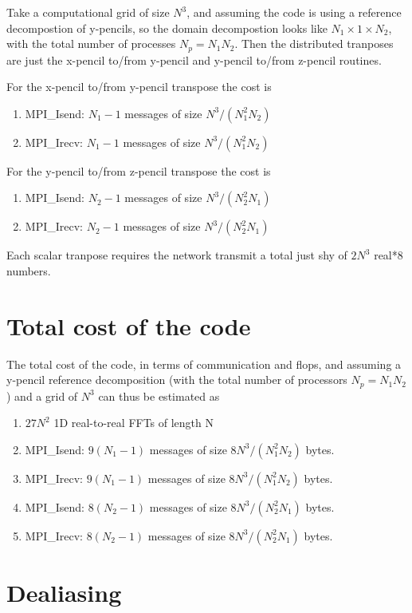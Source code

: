 \documentclass[12pt]{article}
\begin{document}
Take a computational grid of size $N^3$, and assuming the code is
using a reference decompostion of y-pencils, so the domain
decompostion looks like $N_1 \times 1 \times N_2$, with the total
number of processes $N_p = N_1 N_2 $.   Then the distributed
tranposes are just the x-pencil to/from y-pencil and y-pencil to/from
z-pencil routines.  

For the x-pencil to/from y-pencil transpose the cost is
\begin{enumerate}
\item MPI\_Isend:  $N_1 -1$ messages of size $N^3/(N_1^2 N_2)$
\item MPI\_Irecv:  $N_1 -1$ messages of size $N^3/(N_1^2 N_2)$
\end{enumerate}

For the y-pencil to/from z-pencil transpose the cost is
\begin{enumerate}
\item MPI\_Isend:  $N_2 -1$ messages of size $N^3/(N_2^2 N_1)$
\item MPI\_Irecv:  $N_2 -1$ messages of size $N^3/(N_2^2 N_1)$
\end{enumerate}


Each scalar tranpose requires the network transmit a total just
shy of $2N^3$ real*8 numbers.  


\section{Total cost of the code}

The total cost of the code, in terms of communication and flops,
and assuming a y-pencil reference decomposition 
(with the total number of processors $N_p = N_1 N_2$) and a grid of $N^3$
can thus be estimated as

\begin{enumerate}
\item $27N^2$ 1D real-to-real FFTs of length N
\item MPI\_Isend:  $9(N_1 -1)$ messages of size $8N^3/(N_1^2 N_2)$ bytes.
\item MPI\_Irecv:  $9(N_1 -1)$ messages of size $8N^3/(N_1^2 N_2)$ bytes.
\item MPI\_Isend:  $8(N_2 -1)$ messages of size $8N^3/(N_2^2 N_1)$ bytes.
\item MPI\_Irecv:  $8(N_2 -1)$ messages of size $8N^3/(N_2^2 N_1)$ bytes.
\end{enumerate}

\section{Dealiasing}
\end{document}
